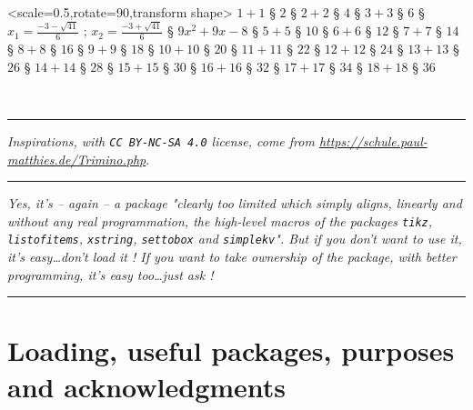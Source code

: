\documentclass[11pt,a4paper]{ltxdoc}
\begin{document}
\begin{tcolorbox}[colframe=lightgray,colback=lightgray!5]
\hfill\tkztriminos%
[size=5cm,showiconlogo,bgcolor=teal!15,font=\large,iconlogo={\scalebox{3}[3]{\textcolor{orange}{\faBahai}}},decocolor=orange]%
<scale=0.5,rotate=90,transform shape>%
{%
	$1+1$ § $2$ §
	$2+2$ § $4$ §
	$3+3$ § ${6}$ §
	{$x_{1}=\frac{-3-\sqrt{41}}{6}$ ; $x_{2}=\frac{-3+\sqrt{41}}{6}$} § $9x^{2}+9x-8$ §
	$5+5$ § $10$ §
	${6}+6$ § $12$ §
	$7+7$ § $14$ §
	$8+8$ § $16$ §
	${9}+{9}$ § $18$ §
	$10+10$ § $20$ §
	$11+11$ § $22$ §
	$12+12$ § $24$ §
	$13+13$ § $26$ §
	$14+14$ § $28$ §
	$15+15$ § $30$ §
	$16+16$ § $32$ §
	$17+17$ § $34$ §
	$18+18$ § $36$
}\hfill~
\end{tcolorbox}

\vfill~

\hrule

\vspace*{2.5mm}

\textit{Inspirations, with \texttt{CC\,BY-NC-SA\,4.0} license, come from  \url{https://schule.paul-matthies.de/Trimino.php}}.

\vspace*{2.5mm}

\hrule

\vspace*{2.5mm}

{\tiny\itshape Yes, it's -- again -- a package "clearly too limited which simply aligns, linearly and without any real programmation, the high-level macros of the packages \lstinline[language={[latex]TeX},basicstyle=\ttfamily]|tikz|, \texttt{listofitems}, \texttt{xstring}, \texttt{settobox} and \texttt{simplekv}". But if you don't want to use it, it's easy\ldots don't load it ! If you want to take ownership of the package, with better programming, it's easy too\ldots just ask !}

\vspace*{2.5mm}

\hrule

\pagebreak


\hypertarget{matoc}{}

\tableofcontents

\vspace*{5mm}


\pagebreak

\section{Loading, useful packages, purposes and acknowledgments}
\end{document}
